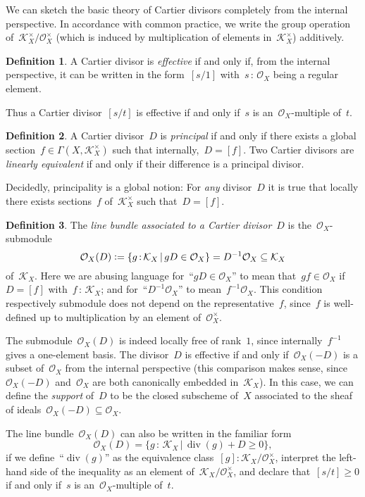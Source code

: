\documentclass[10pt,reqno,a4paper]{amsbook}
\theoremstyle{definition}
\newtheorem{defn}{Definition}[section]
\theoremstyle{plain}
\theoremstyle{remark}
\renewcommand{\O}{\mathcal{O}}
\newcommand{\K}{\mathcal{K}}
\newcommand{\?}{\,{:}\,}
\renewcommand{\_}{\mathpunct{.}\,}
\newcommand{\defeq}{\vcentcolon=}
\begin{document}
We can sketch the basic theory of Cartier divisors completely from the internal
perspective. In accordance with common practice, we write the group
operation of~$\K_X^\times/\O_X^\times$ (which is induced by multiplication of elements
in~$\K_X^\times$) additively.

\begin{defn}\label{defn:effective-cartier-divisor}
A Cartier divisor is \emph{effective} if and only if, from the
internal perspective, it can be written in the form~$[s/1]$ with~$s\?\O_X$
being a regular element.\end{defn}

Thus a Cartier divisor~$[s/t]$ is effective if and only if~$s$ is
an~$\O_X$-multiple of~$t$.

\begin{defn}A Cartier divisor~$D$ is \emph{principal} if and only if there
exists a global section~$f \in \Gamma(X,\K_X^\times)$ such that internally,~$D = [f]$.
Two Cartier divisors are \emph{linearly equivalent} if and only if their
difference is a principal divisor.
\end{defn}

Decidedly, principality is a global notion: For \emph{any} divisor~$D$ it is
true that locally there exists sections~$f$ of~$\K_X^\times$ such that~$D = [f]$.

\begin{defn}\label{defn:line-bundle-of-divisor}
The \emph{line bundle associated to a Cartier divisor}~$D$
is the~$\O_X$-submodule
\[ \O_X(D) \defeq \{ g \? \K_X \,|\, g D \in \O_X \} = D^{-1} \O_X \subseteq \K_X
\]
of~$\K_X$. Here we are abusing language for~``$gD \in \O_X$'' to mean that~$gf
\in \O_X$ if~$D = [f]$ with~$f\?\K_X$; and for~``$D^{-1} \O_X$'' to
mean~$f^{-1}\O_X$. This condition respectively submodule does not depend on the
representative~$f$, since~$f$ is well-defined up to multiplication by an element
of~$\O_X^\times$.\end{defn}

The submodule~$\O_X(D)$ is indeed locally free of rank~$1$, since
internally~$f^{-1}$ gives a one-element basis. The divisor~$D$ is effective if
and only if~$\O_X(-D)$ is a subset of~$\O_X$ from the internal perspective
(this comparison makes sense, since~$\O_X(-D)$ and~$\O_X$ are both canonically
embedded in~$\K_X$). In
this case, we can define the \emph{support} of~$D$ to be the closed subscheme
of~$X$ associated to the sheaf of ideals~$\O_X(-D) \subseteq \O_X$.

The line bundle~$\O_X(D)$ can also be written in the familiar form
\[ \O_X(D) = \{ g \? \K_X \,|\, \operatorname{div}(g) + D \geq 0 \}, \]
if we define~``$\operatorname{div}(g)$'' as the equivalence class~$[g] :
\K_X/\O_X^\times$, interpret the left-hand side of the inequality as an element
of~$\K_X/\O_X^\times$, and declare that~$[s/t] \geq 0$ if and only if~$s$ is
an~$\O_X$-multiple of~$t$.
\end{document}

